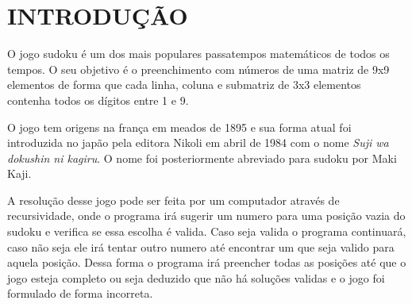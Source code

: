 \documentclass[
	12pt,				%
	openright,			%
	oneside,			%
	a4paper,			%
	chapter=TITLE,		%
	english,			%
	french,				%
	spanish,			%
	brazil,				%
	article,			%
	]{uea-abntex2}
\begin{document}
\newpage

\chapter*{\vspace*{3.4cm}INTRODUÇÃO}
O jogo sudoku é um dos mais populares passatempos matemáticos de todos os tempos. O seu objetivo é o preenchimento com números de uma matriz de 9x9 elementos de forma que cada linha, coluna e submatriz de 3x3 elementos contenha todos os dígitos entre 1 e 9.

O jogo tem origens na frança em meados de 1895 e sua forma atual foi introduzida no japão pela editora Nikoli em abril de 1984 com o nome \emph{Suji wa dokushin ni kagiru}. O nome foi posteriormente abreviado para sudoku por Maki Kaji.\cite{Pegg}

A resolução desse jogo pode ser feita por um computador através de recursividade, onde o programa irá sugerir um numero para uma posição vazia do sudoku e verifica se essa escolha é valida. Caso seja valida o programa continuará, caso não seja ele irá tentar outro numero até encontrar um que seja valido para aquela posição. Dessa forma o programa irá preencher todas as posições até que o jogo esteja completo ou seja deduzido que não há soluções validas e o jogo foi formulado de forma incorreta.\cite{Weeks}


\newpage

\vspace{24pt}
\end{document}
